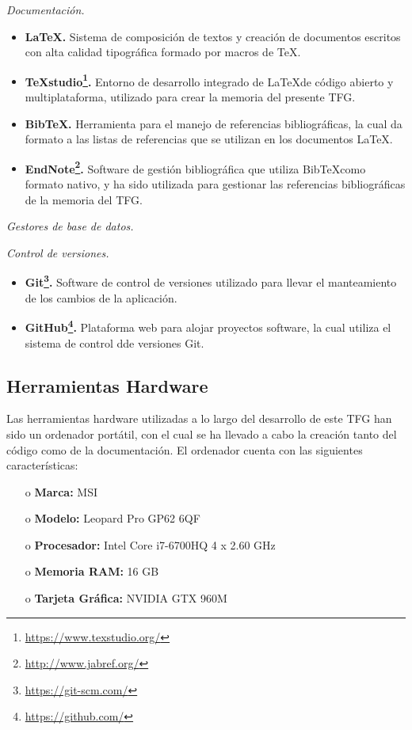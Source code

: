 \emph{Documentación.}
\begin{itemize}
	\item \textbf{\LaTeX.} Sistema de composición de textos y creación de documentos escritos con alta calidad tipográfica formado por macros de \TeX.
	\item \textbf{TeXstudio\footnote{\url{https://www.texstudio.org/}}.} Entorno de desarrollo integrado de \LaTeX de código abierto y multiplataforma, utilizado para crear la memoria del presente TFG.
	\item \textbf{Bib\TeX.} Herramienta para el manejo de referencias bibliográficas, la cual da formato a las listas de referencias que se utilizan en los documentos \LaTeX.
	\item \textbf{EndNote\footnote{\url{http://www.jabref.org/}}.} Software de gestión bibliográfica que utiliza Bib\TeX como formato nativo, y ha sido utilizada para gestionar las referencias bibliográficas de la memoria del TFG.
\end{itemize}

\emph{Gestores de base de datos.}

\emph{Control de versiones.}
\begin{itemize}
	\item \textbf{Git\footnote{\url{https://git-scm.com/}}.} Software de control de versiones utilizado para llevar el manteamiento de los cambios de la aplicación.
	\item \textbf{GitHub\footnote{\url{https://github.com/}}.} Plataforma web para alojar proyectos software, la cual utiliza el sistema de control dde versiones Git.
\end{itemize}

\subsection{Herramientas Hardware}
\label{sec:HerramientasHardware}

Las herramientas hardware utilizadas a lo largo del desarrollo de este TFG han sido un ordenador portátil, con el cual se ha llevado a cabo la creación tanto del código como de la documentación. El ordenador cuenta con las siguientes características:

\begin{itemize}
	\item[o] \textbf{Marca:} MSI
	\item[o] \textbf{Modelo:} Leopard Pro GP62 6QF
	\item[o] \textbf{Procesador:} Intel Core i7-6700HQ 4 x 2.60 GHz
	\item[o] \textbf{Memoria RAM:} 16 GB
	\item[o] \textbf{Tarjeta Gráfica:} NVIDIA GTX 960M
\end{itemize}